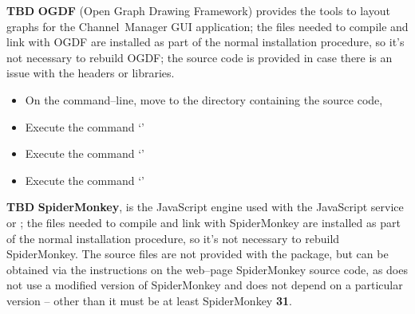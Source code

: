 \tertiaryEnd{}
\textbf{TBD}
\tertiaryEnd{}
\secondaryEnd{}
\textbf{OGDF} (Open Graph Drawing Framework) provides the tools to layout graphs for the
Channel~Manager GUI application; the files needed to compile and link with OGDF are
installed as part of the normal \mplusm{} installation procedure, so it's not necessary to
rebuild OGDF; the source code is provided in case there is an issue with the headers or
libraries.
\begin{itemize}
\item On the command--line, move to the directory containing the \mplusm{} source code,
\item Execute the command `'
\item Execute the command `'
\item Execute the command `'
\end{itemize}
\tertiaryEnd{}
\textbf{TBD}
\tertiaryEnd{}
\secondaryEnd{}
\textbf{SpiderMonkey}, is the JavaScript engine used with the JavaScript service or
\mplusm{}; the files needed to compile and link with SpiderMonkey are installed as part of
the normal \mplusm{} installation procedure, so it's not necessary to rebuild
SpiderMonkey.
The source files are not provided with the  package, but can be obtained
via the instructions on the web--page
%
{SpiderMonkey source code}, as \mplusm{} does not use a modified version of SpiderMonkey
and does not depend on a particular version -- other than it must be at least SpiderMonkey
\textbf{31}.
